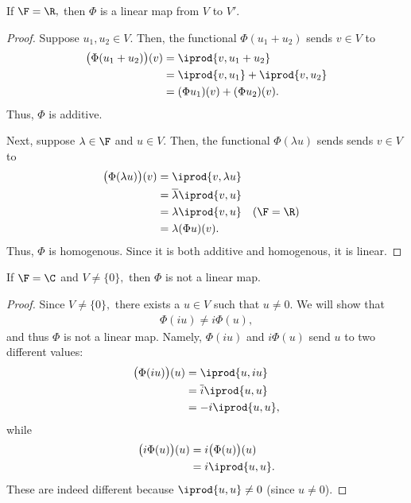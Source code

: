 \documentclass{amsart}
\begin{document}
\begin{claim}
If $\F=\R,$ then $\Phi$ is a linear map from $V$ to $V'.$
\end{claim}
\begin{proof}
Suppose $u_1,u_2\in V.$ Then, the functional $\Phi(u_1+u_2)$ sends
$v\in V$ to
\begin{align*}
    \big(\Phi(u_1+u_2)\big)(v) &= \iprod{v,u_1+u_2} \\
                     &= \iprod{v,u_1}+\iprod{v,u_2} \\
                     &= (\Phi u_1)(v)+(\Phi u_2)(v).
\end{align*}
Thus, $\Phi$ is additive.

Next, suppose $\lambda\in\F$ and
$u\in V.$ Then, the functional $\Phi(\lambda u)$ sends
sends $v\in V$ to
\begin{align*}
    \big(\Phi(\lambda u)\big)(v) &= \iprod{v, \lambda u} \\
                                 &= \overline\lambda\iprod{v, u} \\
                                 &= \lambda\iprod{v,u} &&(\F=\R) \\
                                 &= \lambda(\Phi{u})(v).
\end{align*}
Thus, $\Phi$ is homogenous. Since it is both additive and homogenous,
it is linear.
\end{proof}

\vspace{0.5in}

\begin{claim}
If $\F=\C$ and $V\ne\{0\},$ then $\Phi$ is not a linear map.
\end{claim}
\begin{proof}
Since $V\ne\{0\},$ there exists a $u\in V$ such that $u\ne 0.$
We will show that
\begin{align*}
\Phi(iu)\ne i\Phi(u),
\end{align*}
and thus $\Phi$ is not a linear map. Namely,
$\Phi(iu)$ and $i\Phi(u)$ send $u$ to two different values:
\begin{align*}
    \big(\Phi(iu)\big)(u) &= \iprod{u,iu} \\
                          &= \overline i\iprod{u,u} \\
                          &= -i\iprod{u,u},
\end{align*}
while
\begin{align*}
    \big(i\Phi(u)\big)(u) &= i\big(\Phi(u)\big)(u) \\
                          &= i\iprod{u,u}.
\end{align*}
These are indeed different because $\iprod{u,u}\ne0$ (since $u\ne 0$).
\end{proof}
\end{document}
